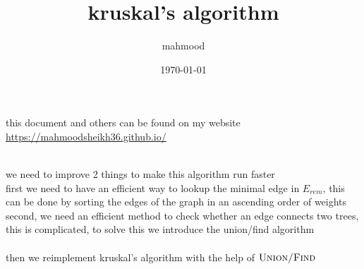 \documentclass[a4paper,12pt]{article}
\author{mahmood}
\date{\today}
\title{kruskal's algorithm}
\begin{document}
\maketitle
\begin{note}
this document and others can be found on my website\\
\url{https://mahmoodsheikh36.github.io/}
\end{note}
\\

we need to improve 2 things to make this algorithm run faster\\
first we need to have an efficient way to lookup the minimal edge in \(E_{rem}\), this can be done by sorting the edges of the graph in an ascending order of weights\\
second, we need an efficient method to check whether an edge connects two trees, this is complicated, to solve this we introduce the union/find algorithm\\
\\

then we reimplement kruskal's algorithm with the help of \(\textsc{Union/Find}\)\\
\\
\end{document}
